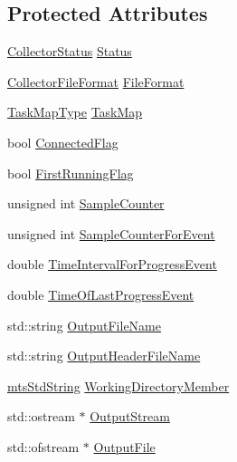 \subsection*{Protected Attributes}
\begin{DoxyCompactItemize}
\item 
\hyperlink{classmts_collector_base_adfbc058665584a56933a7997229c1fb6}{Collector\-Status} \hyperlink{classmts_collector_base_ae5b1e57c993774b77da77f1e1fc7d73c}{Status}
\item 
\hyperlink{classmts_collector_base_aa228bed8144053d0bfa316f9ac9d0901}{Collector\-File\-Format} \hyperlink{classmts_collector_base_a5afbc705a454a6e1394ff4bfd1c17774}{File\-Format}
\item 
\hyperlink{classmts_collector_base_a6b47b3df8797f600ac9791640561f035}{Task\-Map\-Type} \hyperlink{classmts_collector_base_a4e9b221e6cdeb2fbddaf44ffbe9e3b0e}{Task\-Map}
\item 
bool \hyperlink{classmts_collector_base_a68e1ba8a88b403471103ad596fd3f002}{Connected\-Flag}
\item 
bool \hyperlink{classmts_collector_base_abed8163d5f91e30ac10344e82c405cd7}{First\-Running\-Flag}
\item 
unsigned int \hyperlink{classmts_collector_base_a08c8c1889a10cba359bc799bbf5d218b}{Sample\-Counter}
\item 
unsigned int \hyperlink{classmts_collector_base_a199b6fdd92f3a5912b6d7fd10af5b205}{Sample\-Counter\-For\-Event}
\item 
double \hyperlink{classmts_collector_base_ab6c33b31e4651991098cd0963a575d24}{Time\-Interval\-For\-Progress\-Event}
\item 
double \hyperlink{classmts_collector_base_aa33295c29dd9bc683cb95a9f57c5a09e}{Time\-Of\-Last\-Progress\-Event}
\item 
std\-::string \hyperlink{classmts_collector_base_a86248c53c5807c8b9a21b232d89b26dd}{Output\-File\-Name}
\item 
std\-::string \hyperlink{classmts_collector_base_adf377242f1cf745ccedf71f6505d1095}{Output\-Header\-File\-Name}
\item 
\hyperlink{mts_generic_object_proxy_8h_adbc21bfbf98367e582bf8a263b7e711f}{mts\-Std\-String} \hyperlink{classmts_collector_base_a1af964c915eb2090cc72a8515dcbea6d}{Working\-Directory\-Member}
\item 
std\-::ostream $\ast$ \hyperlink{classmts_collector_base_a4901f9bf045081f0d79ada98fb06c57b}{Output\-Stream}
\item 
std\-::ofstream $\ast$ \hyperlink{classmts_collector_base_a7072747db6ae6fb544364d8fe11f741d}{Output\-File}

\end{DoxyCompactItemize}
